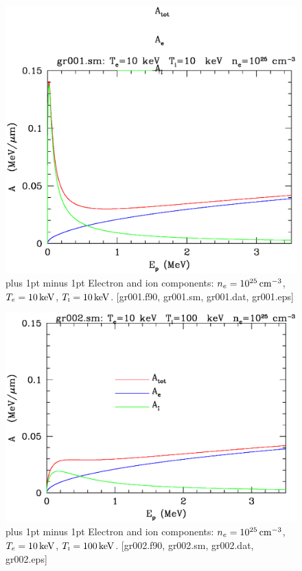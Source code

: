 \documentclass[preprint,12pt,eqsecnum,nofootinbib,amsmath,amssymb]{revtex4}
\newcommand{\smI}{{\rm\scriptscriptstyle I}}
\newcommand{\footnoteskip}{\baselineskip 12pt plus 1pt minus 1pt}
\begin{document}
\vskip-2.5cm 
\begin{figure}[h!]
\includegraphics[scale=0.45]{gr001.eps} 
\vskip-0.8cm 
\caption{\footnoteskip  
  Electron and ion components: $n_e=10^{25}\,{\rm cm^{-3}}$,
  $T_e=10\,{\rm keV}$, $T_\smI=10\,{\rm keV}$. [gr001.f90, gr001.sm,
  gr001.dat, gr001.eps]
}
\label{fig:gr001}
\end{figure}

\vskip-2cm 
\begin{figure}[h!]
\includegraphics[scale=0.45]{gr002.eps} 
\vskip-0.8cm 
\caption{\footnoteskip  
  Electron and ion components: $n_e=10^{25}\,{\rm cm^{-3}}$,
  $T_e=10\,{\rm keV}$, $T_\smI=100\,{\rm keV}$. [gr002.f90, gr002.sm,
  gr002.dat, gr002.eps]
}
\label{fig:gr002}
\end{figure}
\end{document}

